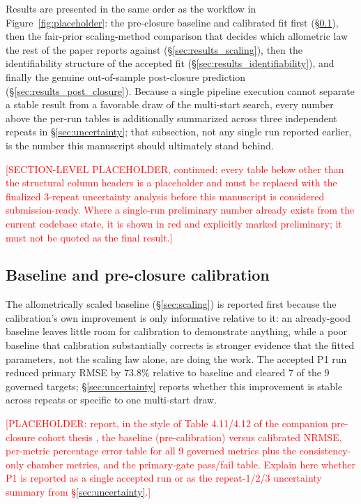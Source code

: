 \documentclass{article}
\begin{document}
Results are presented in the same order as the workflow in Figure~\ref{fig:placeholder}: the pre-closure baseline and calibrated fit first (\S\ref{sec:results_calibration}), then the fair-prior scaling-method comparison that decides which allometric law the rest of the paper reports against (\S\ref{sec:results_scaling}), then the identifiability structure of the accepted fit (\S\ref{sec:results_identifiability}), and finally the genuine out-of-sample post-closure prediction (\S\ref{sec:results_post_closure}). Because a single pipeline execution cannot separate a stable result from a favorable draw of the multi-start search, every number above the per-run tables is additionally summarized across three independent repeats in \S\ref{sec:uncertainty}; that subsection, not any single run reported earlier, is the number this manuscript should ultimately stand behind.

\textcolor{red}{[SECTION-LEVEL PLACEHOLDER, continued: every table below other than the structural column headers is a placeholder and must be replaced with the finalized 3-repeat uncertainty analysis before this manuscript is considered submission-ready. Where a single-run preliminary number already exists from the current codebase state, it is shown in red and explicitly marked preliminary; it must not be quoted as the final result.]}

\subsection{Baseline and pre-closure calibration}
\label{sec:results_calibration}

The allometrically scaled baseline (\S\ref{sec:scaling}) is reported first because the calibration's own improvement is only informative relative to it: an already-good baseline leaves little room for calibration to demonstrate anything, while a poor baseline that calibration substantially corrects is stronger evidence that the fitted parameters, not the scaling law alone, are doing the work. The accepted P1 run reduced primary RMSE by 73.8\% relative to baseline and cleared 7 of the 9 governed targets; \S\ref{sec:uncertainty} reports whether this improvement is stable across repeats or specific to one multi-start draw.

\textcolor{red}{[PLACEHOLDER: report, in the style of Table 4.11/4.12 of
the companion pre-closure cohort thesis \cite{Subagyo2026Thesis}, the
baseline (pre-calibration) versus calibrated NRMSE, per-metric percentage
error table for all 9 governed metrics plus the consistency-only chamber
metrics, and the primary-gate pass/fail table. Explain here whether P1 is
reported as a single accepted run or as the repeat-1/2/3 uncertainty
summary from \S\ref{sec:uncertainty}.]}
\end{document}

